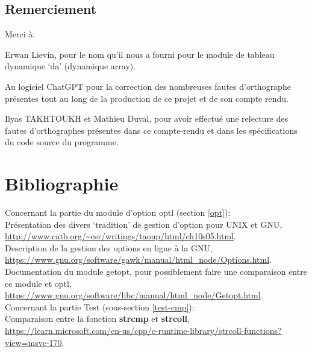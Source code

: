 \documentclass[12pt]{article}
\begin{document}
    \subsection{Remerciement}

    Merci à\@: 

    Erwan Lievin, pour le nom qu'il nous a fourni pour le module de tableau 
    dynamique `da' (dynamique array).

    Au logiciel ChatGPT pour la correction des nombreuses fautes d'orthographe 
    présentes tout au long de la production de ce projet et de son compte rendu.

    Ilyas TAKHTOUKH et Mathieu Duval, pour avoir effectué une relecture des fautes 
    d'orthographes présentes dans ce compte-rendu et dans les spécifications du 
    code source du programme.

    \newpage

    \section{Bibliographie}
        \noindent Concernant la partie du module d'option optl 
        (section \ref{opt}):\\ Présentation des divers `tradition' de gestion 
        d'option pour UNIX et GNU, 
        \url{http://www.catb.org/~esr/writings/taoup/html/ch10s05.html}.\\
        Description de la gestion des options en ligne à la GNU, 
        \url{https://www.gnu.org/software/gawk/manual/html_node/Options.html}.\\
        Documentation du module getopt, pour possiblement faire une comparaison 
        entre ce module et optl, 
        \url{https://www.gnu.org/software/libc/manual/html_node/Getopt.html}.\\
        \noindent Concernant la partie Test (sous-section \ref{test-cmp}):\\
        Comparaison entre la fonction \textbf{strcmp} et \textbf{strcoll}, 
        \url{https://learn.microsoft.com/en-us/cpp/c-runtime-library/strcoll-functions?view=msvc-170}.
\end{document}
